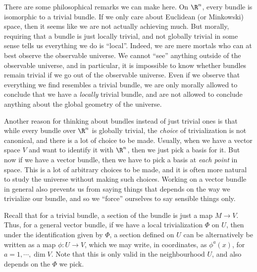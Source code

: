 \documentclass[a4paper]{article}
\begin{document}
There are some philosophical remarks we can make here. On $\R^n$, every bundle is isomorphic to a trivial bundle. If we only care about Euclidean (or Minkowski) space, then it seems like we are not actually achieving much. But morally, requiring that a bundle is just locally trivial, and not globally trivial in some sense tells us everything we do is ``local''. Indeed, we are mere mortals who can at best observe the observable universe. We cannot ``see'' anything outside of the observable universe, and in particular, it is impossible to know whether bundles remain trivial if we go out of the observable universe. Even if we observe that everything we find resembles a trivial bundle, we are only morally allowed to conclude that we have a \emph{locally} trivial bundle, and are not allowed to conclude anything about the global geometry of the universe.

Another reason for thinking about bundles instead of just trivial ones is that while every bundle over $\R^n$ is globally trivial, the \emph{choice} of trivialization is not canonical, and there is a lot of choice to be made. Usually, when we have a vector space $V$ and want to identify it with $\R^n$, then we just pick a basis for it. But now if we have a vector bundle, then we have to pick a basis at \emph{each point} in space. This is a lot of arbitrary choices to be made, and it is often more natural to study the universe without making such choices. Working on a vector bundle in general also prevents us from saying things that depends on the way we trivialize our bundle, and so we ``force'' ourselves to say sensible things only.

Recall that for a trivial bundle, a section of the bundle is just a map $M \to V$. Thus, for a general vector bundle, if we have a local trivialization $\Phi$ on $U$, then under the identification given by $\Phi$, a section defined on $U$ can be alternatively be written as a map $\phi: U \to V$, which we may write, in coordinates, as $\phi^a(x)$, for $a = 1, \cdots, \dim V$. Note that this is only valid in the neighbourhood $U$, and also depends on the $\Phi$ we pick.
\end{document}
